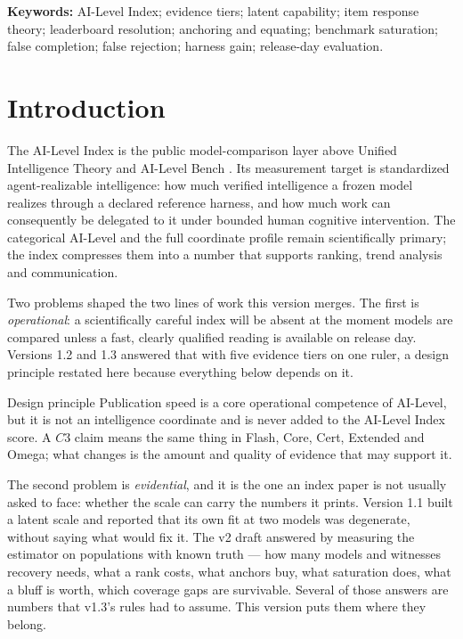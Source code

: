 \documentclass[11pt]{article}
\theoremstyle{definition}
\begin{document}
\noindent\textbf{Keywords:} AI-Level Index; evidence tiers; latent capability; item response theory; leaderboard resolution; anchoring and equating; benchmark saturation; false completion; false rejection; harness gain; release-day evaluation.

\tableofcontents
\bigskip

\section{Introduction}\label{sec:intro}

The AI-Level Index is the public model-comparison layer above Unified Intelligence Theory \citep{yang2026unified} and AI-Level Bench \citep{yang2026hilbench,yang2026hilbenchpaper}. Its measurement target is standardized agent-realizable intelligence: how much verified intelligence a frozen model realizes through a declared reference harness, and how much work can consequently be delegated to it under bounded human cognitive intervention. The categorical AI-Level and the full coordinate profile remain scientifically primary; the index compresses them into a number that supports ranking, trend analysis and communication.

Two problems shaped the two lines of work this version merges. The first is \emph{operational}: a scientifically careful index will be absent at the moment models are compared unless a fast, clearly qualified reading is available on release day. Versions 1.2 and 1.3 answered that with five evidence tiers on one ruler, a design principle restated here because everything below depends on it.

\begin{claimbox}{Design principle}
Publication speed is a core operational competence of AI-Level, but it is not an intelligence coordinate and is never added to the AI-Level Index score. A $C3$ claim means the same thing in Flash, Core, Cert, Extended and Omega; what changes is the amount and quality of evidence that may support it.
\end{claimbox}

The second problem is \emph{evidential}, and it is the one an index paper is not usually asked to face: whether the scale can carry the numbers it prints. Version 1.1 built a latent scale and reported that its own fit at two models was degenerate, without saying what would fix it. The v2 draft answered by measuring the estimator on populations with known truth --- how many models and witnesses recovery needs, what a rank costs, what anchors buy, what saturation does, what a bluff is worth, which coverage gaps are survivable. Several of those answers are numbers that v1.3's rules had to assume. This version puts them where they belong.
\end{document}
